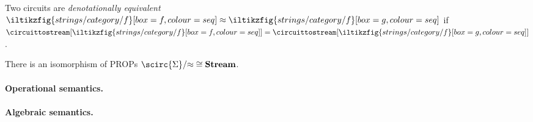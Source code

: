 \documentclass[10pt]{article}
\begin{document}
\begin{definition}
    Two circuits are \emph{denotationally equivalent} \(
    \iltikzfig{strings/category/f}[box=f,colour=seq]
    \approx
    \iltikzfig{strings/category/f}[box=g,colour=seq]
    \) if \(
    \circuittostream[\iltikzfig{strings/category/f}[box=f,colour=seq]]{}
    =
    \circuittostream[\iltikzfig{strings/category/f}[box=g,colour=seq]]{}
    \).
\end{definition}

\begin{corollary}
    There is an isomorphism of PROPs
    \(\scirc{\Sigma} / {\approx} \cong \mathbf{Stream}\).
\end{corollary}

\paragraph*{Operational semantics.}

\paragraph*{Algebraic semantics.}

\printbibliography[heading=bibintoc,title={References}]
\end{document}
